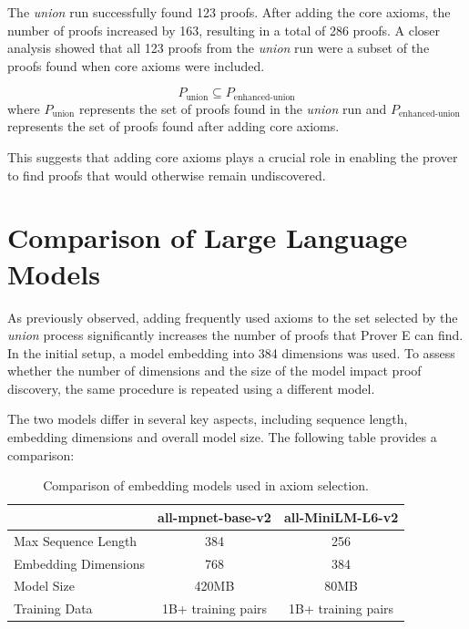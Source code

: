 \documentclass[english,version-2020-11]{uzl-thesis}
\begin{document}
The \textit{union} run successfully found 123 proofs. After adding the core axioms, the number of proofs increased by 163, resulting in a total of 286 proofs. A closer analysis showed that all 123 proofs from the \textit{union} run were a subset of the proofs found when core axioms were included. 

\begin{equation}
    P_{\text{union}} \subseteq P_{\text{enhanced-union}}
\end{equation}
where \( P_{\text{union}} \) represents the set of proofs found in the \textit{union} run and \( P_{\text{enhanced-union}} \) represents the set of proofs found after adding core axioms.


This suggests that adding core axioms plays a crucial role in enabling the prover to find proofs that would otherwise remain undiscovered.


\section{Comparison of Large Language Models}

As previously observed, adding frequently used axioms to the set selected by the \textit{union} process significantly increases the number of proofs that Prover E can find. In the initial setup, a model embedding into 384 dimensions was used. To assess whether the number of dimensions and the size of the model impact proof discovery, the same procedure is repeated using a different model.

The two models differ in several key aspects, including sequence length, embedding dimensions and overall model size. The following table provides a comparison:

\begin{table}[h]
    \centering
    \begin{tabular}{lcc}
        \hline
        & \textbf{all-mpnet-base-v2} & \textbf{all-MiniLM-L6-v2} \\
        \hline
        Max Sequence Length & 384 & 256 \\
        Embedding Dimensions & 768 & 384 \\
        Model Size & 420MB & 80MB \\
        Training Data & 1B+ training pairs & 1B+ training pairs \\
        \hline
    \end{tabular}
    \caption{Comparison of embedding models used in axiom selection.}
    \label{tab:model_comparison}
\end{table}
\end{document}
